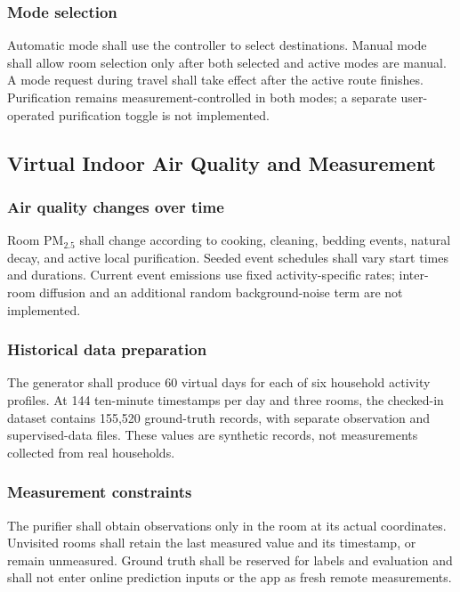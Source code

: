 \documentclass[conference]{IEEEtran}
\newcommand{\pmfine}{\ensuremath{\mathrm{PM}_{2.5}}}
\begin{document}
\subsubsection{Mode selection}

Automatic mode shall use the controller to select destinations. Manual mode shall allow room selection only after both selected and active modes are manual. A mode request during travel shall take effect after the active route finishes. Purification remains measurement-controlled in both modes; a separate user-operated purification toggle is not implemented.

\subsection{Virtual Indoor Air Quality and Measurement}

\subsubsection{Air quality changes over time}

Room \pmfine{} shall change according to cooking, cleaning, bedding events, natural decay, and active local purification. Seeded event schedules shall vary start times and durations. Current event emissions use fixed activity-specific rates; inter-room diffusion and an additional random background-noise term are not implemented.

\subsubsection{Historical data preparation}

The generator shall produce 60 virtual days for each of six household activity profiles. At 144 ten-minute timestamps per day and three rooms, the checked-in dataset contains 155,520 ground-truth records, with separate observation and supervised-data files. These values are synthetic records, not measurements collected from real households.

\subsubsection{Measurement constraints}

The purifier shall obtain observations only in the room at its actual coordinates. Unvisited rooms shall retain the last measured value and its timestamp, or remain unmeasured. Ground truth shall be reserved for labels and evaluation and shall not enter online prediction inputs or the app as fresh remote measurements.
\end{document}
